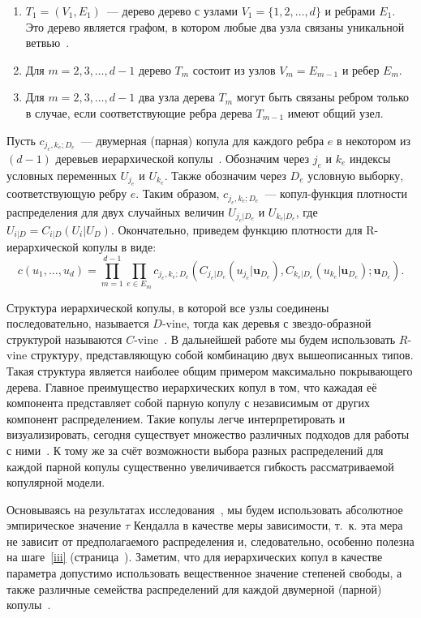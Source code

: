 \begin{enumerate}[label=(\arabic*),labelwidth=1cm,leftmargin=1cm]
\item $T_1 = (V_1, E_1)$~--- дерево дерево с узлами $V_1 = \{1, 2, \ldots, d\}$ и ребрами $E_1$. 
Это дерево является графом, в котором любые два узла связаны уникальной ветвью~\cite{Diestel2005}.
\item Для $m = 2, 3, \ldots, d - 1$ дерево $T_m$ состоит из узлов $V_m = E_{m-1}$ и ребер $E_m$.
\item \label{iii} Для $m = 2, 3, \ldots, d - 1$ два узла дерева $T_m$ могут быть связаны ребром только в случае, если соответствующие ребра дерева $T_{m-1}$ имеют общий узел.
\end{enumerate}

Пусть $c_{j_e, k_e; D_e}$~--- двумерная (парная) копула для каждого ребра $e$ в некотором из $(d - 1)$ деревьев иерархической копулы~\cite{Czado2010}. 
Обозначим через $j_e$ и $k_e$ индексы условных переменных $U_{j_e}$ и $U_{k_e}$. 
Также обозначим через $D_e$ условную выборку, соответствующую ребру $e$. 
Таким образом, $c_{j_e, k_e; D_e}$~--- копул-функция плотности распределения для двух случайных величин $U_{j_e|D_e}$ и $U_{k_e|D_e}$, где $U_{i|D} = C_{i|D} (U_i|U_D)$. 
Окончательно, приведем функцию плотности для R-иерархической копулы в виде:
\begin{equation}
    c(u_1, \ldots, u_d) = \prod_{m=1}^{d-1} \prod_{e \in E_m} c_{j_e,k_e;D_e} \left( C_{j_e|D_e} (u_{j_e}|\textbf{u}_{D_e}), C_{k_e|D_e} (u_{k_e}|\textbf{u}_{D_e}); \textbf{u}_{D_e} \right).
\end{equation}

Структура иерархической копулы, в которой все узлы соединены последовательно, называется $D$-vine, тогда как деревья с звездо-образной структурой называются $C$-vine~\cite{Dissmann2013}. 
В дальнейшей работе мы будем использовать $R$-vine структуру, представляющую собой комбинацию двух вышеописанных типов. 
Такая структура является наиболее общим примером максимально покрывающего дерева.
Главное преимущество иерархических копул в том, что кажадая её компонента представляет собой парную копулу с независимым от других компонент распределением.
Такие копулы легче интерпретировать и визуализировать, сегодня существует множество различных подходов для работы с ними~\cite{Cooke2015, Czado2010, Dissmann2013}. 
К тому же за счёт возможности выбора разных распределений для каждой парной копулы существенно увеличивается гибкость рассматриваемой копулярной модели.

Основываясь на результатах исследования~\cite{Dissmann2013}, мы будем использовать абсолютное эмпирическое значение $\tau$ Кендалла в качестве меры зависимости, т.~к. эта мера не зависит от предполагаемого распределения и, следовательно, особенно полезна на шаге~\ref{iii} (страница~\pageref{iii}).
Заметим, что для иерархических копул в качестве параметра допустимо использовать вещественное значение степеней свободы, %
а также различные семейства распределений для каждой двумерной (парной) копулы~\cite{Bel2010}.

